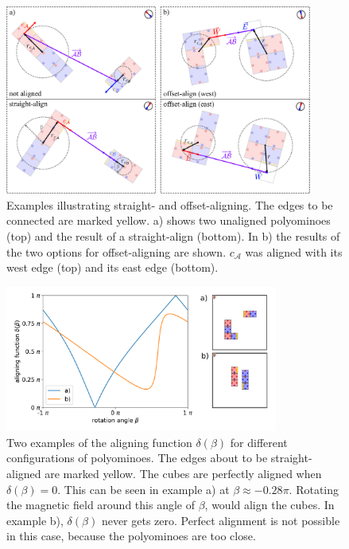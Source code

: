 \begin{figure}
	\centering
	\includegraphics[width=0.90\textwidth]{figures/aligning.pdf}
	\caption[Illustration of straight- and offset-aligning]{Examples illustrating straight- and offset-aligning. The edges to be connected are marked yellow. a) shows two unaligned polyominoes (top) and the result of a straight-align (bottom). In b) the results of the two options for offset-aligning are shown. $c_\mathcal{A}$ was aligned with its west edge (top) and its east edge (bottom).}
	\label{fig:aligning}
\end{figure}

\begin{figure}
	\centering
	\includegraphics[width=0.8\textwidth]{figures/plots/aligning_function.pdf}
	\caption[Examples of aligning functions $\delta(\beta)$]{Two examples of the aligning function $\delta(\beta)$ for different configurations of polyominoes. The edges about to be straight-aligned are marked yellow. The cubes are perfectly aligned when $\delta(\beta) = 0$. This can be seen in example a) at $\beta \approx -0.28\pi$. Rotating the magnetic field around this angle of $\beta$, would align the cubes. In example b), $\delta(\beta)$ never gets zero. Perfect alignment is not possible in this case, because the polyominoes are too close.}
	\label{fig:aligning_plot}
\end{figure}


